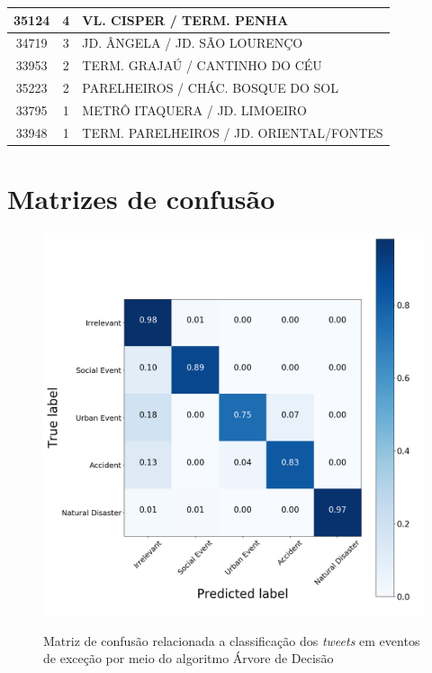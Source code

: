 \documentclass[
	12pt,				%
	oneside,			%
	a4paper,			%
	english,			%
	brazil				%
	]{abntex2ppgsi}
\begin{document}
\begin{apendicesenv}
\begin{longtable}{c|c|p{7cm}}
    35124 & 4     & VL. CISPER / TERM. PENHA \\
\hline

    34719 & 3     & JD. ÂNGELA / JD. SÃO LOURENÇO \\
\hline

    33953 & 2     & TERM. GRAJAÚ / CANTINHO DO CÉU \\
\hline

    35223 & 2     & PARELHEIROS / CHÁC. BOSQUE DO SOL \\
\hline

    33795 & 1     & METRÔ ITAQUERA / JD. LIMOEIRO \\
\hline

    33948 & 1     & TERM. PARELHEIROS / JD. ORIENTAL/FONTES \\
\hline


\end{longtable}

\normalsize

\chapter{Matrizes de confusão}
\label{apendiceE}

\begin{figure}[!htb]
	\centering
 	  \caption{Matriz de confusão relacionada a classificação dos \textit{tweets} em eventos de exceção por meio do algoritmo Árvore de Decisão}
		\includegraphics[width=1\linewidth]{images/confusion_matrix_dt.png}
	\label{fig:confusion_matrix_dt}
\end{figure}


\end{apendicesenv}
\end{document}
